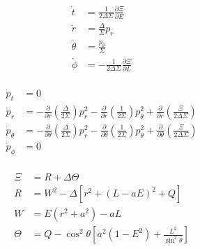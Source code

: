 \begin{align*}
	\dot{t} &= \frac{1}{2\Delta \Sigma} \frac{\partial \Xi}{\partial E}\\
	\dot{r} &= \frac{\Delta}{\Sigma} p_r \\
	\dot{\theta} &= \frac{p_\theta}{\Sigma}\\
	\dot{\phi} &= - \frac{1}{2\Delta \Sigma} \frac{\partial \Xi}{\partial L}\\	
\end{align*}

\begin{align*}
\dot{p}_t &= 0\\
\dot{p}_r &= -\frac{\partial}{\partial r}\left( \frac{\Delta}{2\Sigma}\right) p_r^2 - \frac{\partial}{\partial r}\left( \frac{1}{2\Sigma}\right) p_\theta^2 + \frac{\partial}{\partial r}\left( \frac{\Xi}{2\Delta \Sigma}\right) \\
\dot{p}_\theta &= -\frac{\partial}{\partial \theta}\left( \frac{\Delta}{2\Sigma}\right) p_r^2 - \frac{\partial}{\partial \theta}\left( \frac{1}{2\Sigma}\right) p_\theta^2 + \frac{\partial}{\partial \theta}\left( \frac{\Xi}{2\Delta \Sigma}\right)\\
\dot{p}_\phi &= 0\\	
\end{align*}

\begin{align*}
	\Xi &= R + \Delta \Theta \\
	R &= W^2 - \Delta \left[ r^2 + (L-aE)^2 + Q \right] \\
	W &= E(r^2 + a^2) - aL\\
	\Theta &= Q - \cos^2 \theta \left[ a^2 (1-E^2) + \frac{L^2}{\sin^2 \theta} \right]
\end{align*}






